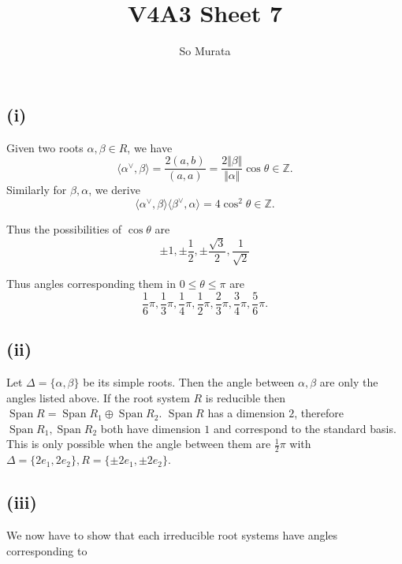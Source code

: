 \documentclass{article}
\title{V4A3 Sheet 7}
\author{So Murata}
\date{}
\numberwithin{equation}{section}
\DeclareMathOperator{\Span}{Span}
\begin{document}
\maketitle 
\subsection*{(i)}
Given two roots $\alpha,\beta\in R$, we have
\begin{equation*}
\langle\alpha^\lor,\beta\rangle = {\frac {2(a,b)} {(a,a)}} = {\frac {2\Vert \beta\Vert} {\Vert \alpha\Vert}}\cos\theta\in\mathbb{Z}.
\end{equation*}
Similarly for $\beta,\alpha$, we derive
\begin{equation*}
\langle\alpha^\lor,\beta\rangle\langle\beta^\lor,\alpha\rangle = 4\cos^2\theta\in\mathbb{Z}.
\end{equation*}

Thus the possibilities of $\cos\theta$ are
\begin{equation*}
\pm 1, \pm{\frac 1 2}, \pm{\frac {\sqrt{3}} 2},{\frac 1 {\sqrt{2}}}
\end{equation*}

Thus angles corresponding them in $0\leq\theta\leq\pi$ are
\begin{equation*}
{\frac {1} {6}}\pi,{\frac {1} {3}}\pi,{\frac {1} {4}}\pi,{\frac {1} {2}}\pi,{\frac {2} {3}}\pi,{\frac {3} {4}}\pi,{\frac {5} {6}}\pi.
\end{equation*}

\subsection*{(ii)}

Let $\Delta=\{\alpha,\beta\}$ be its simple roots. Then the angle between $\alpha,\beta$ are only the angles listed above. If the root system $R$ is reducible then $\Span R = \Span R_1\oplus\Span R_2$. $\Span R$ has a dimension $2$, therefore $\Span R_1,\Span R_2$ both have dimension $1$ and correspond to the standard basis. This is only possible when the angle between them are ${\frac 1 2}\pi$ with $\Delta=\{2e_1,2e_2\}, R=\{\pm 2e_1,\pm2e_2\}$.

\subsection*{(iii)}

We now have to show that each irreducible root systems have angles corresponding to 
\end{document}
